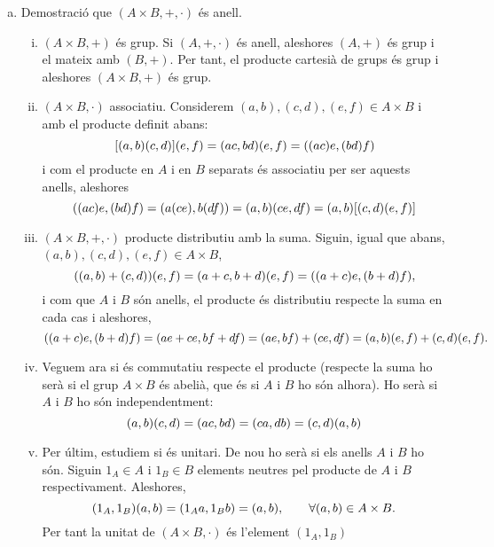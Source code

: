 \documentclass[../main.tex]{subfiles}
\begin{document}
\begin{sol}
\begin{enumerate}[(a)]
    \item Demostració que $(A\times B,+,\cdotp)$ és anell.
    \begin{enumerate}[(i)]
        \item $(A\times B,+)$ és grup. Si $(A,+,\cdotp )$ és anell, aleshores $(A,+)$ és grup i el mateix amb $(B,+)$. Per tant, el producte cartesià de grups és grup i aleshores $(A\times B,+)$ és grup.
        \item $(A\times B,\cdotp)$ associatiu. Considerem $(a,b),(c,d),(e,f)\in A\times B$ i amb el producte definit abans:
        \begin{equation}
            \notag
            [(a,b)(c,d)](e,f)=(ac,bd)(e,f)=((ac)e,(bd)f)
        \end{equation}
        i com el producte en $A$ i en $B$ separats és associatiu per ser aquests anells, aleshores
        \begin{equation}
            \notag
            ((ac)e,(bd)f)=(a(ce),b(df))=(a,b)(ce,df)=(a,b)[(c,d)(e,f)]
        \end{equation}
        
        \item $(A\times B,+,\cdotp)$ producte distributiu amb la suma. Siguin, igual que abans, $(a,b),(c,d),(e,f)\in A\times B$, 
        \begin{equation}
            \notag
            ((a,b)+(c,d))(e,f)=(a+c,b+d)(e,f)=((a+c)e,(b+d)f),
        \end{equation}
        i com que $A$ i $B$ són anells, el producte és distributiu respecte la suma en cada cas i aleshores, 
        \begin{equation}
            \notag
            ((a+c)e,(b+d)f) = (ae+ce,bf+df)=(ae,bf)+(ce,df)=(a,b)(e,f)+(c,d)(e,f).
        \end{equation}
        
        \item Veguem ara si és commutatiu respecte el producte (respecte la suma ho serà si el grup $A\times B$ és abelià, que és si $A$ i $B$ ho són alhora). Ho serà si $A$ i $B$ ho són independentment:
        \begin{equation}
            \notag
            (a,b)(c,d)=(ac,bd)=(ca,db)=(c,d)(a,b)
        \end{equation}
        \item Per últim, estudiem si és unitari. De nou ho serà si els anells $A$ i $B$ ho són. Siguin $1_A\in A$ i $1_B\in B$ elements neutres pel producte de $A$ i $B$ respectivament. Aleshores, 
        \begin{equation}
            \notag
            (1_A,1_B)(a,b)=(1_Aa,1_Bb)=(a,b),\qquad \forall (a,b)\in A\times B.
        \end{equation}
        Per tant la unitat de $(A\times B, \cdotp )$ és l'element $(1_A,1_B)$
    \end{enumerate}
    

\end{enumerate}
\end{sol}
\end{document}
